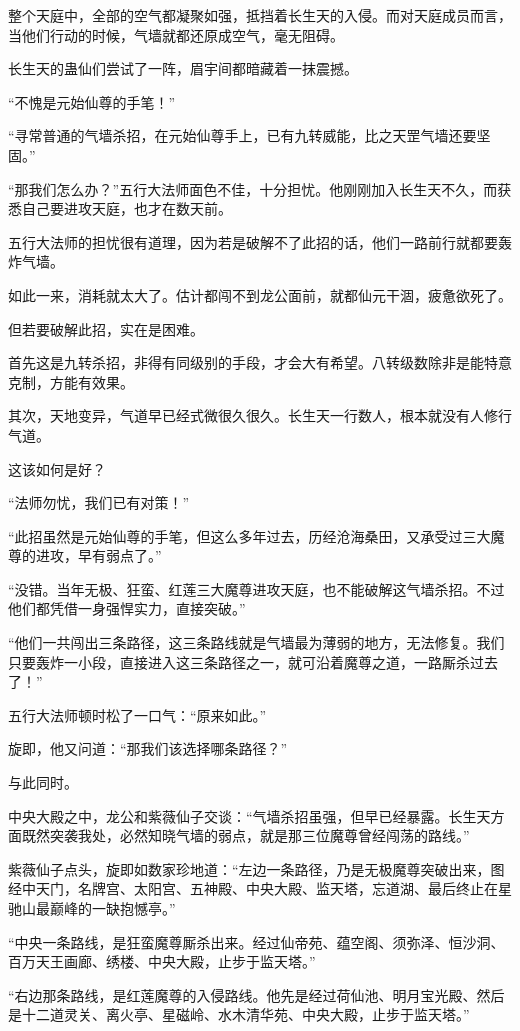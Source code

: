 \begin{this_body}
整个天庭中，全部的空气都凝聚如强，抵挡着长生天的入侵。而对天庭成员而言，当他们行动的时候，气墙就都还原成空气，毫无阻碍。

长生天的蛊仙们尝试了一阵，眉宇间都暗藏着一抹震撼。

“不愧是元始仙尊的手笔！”

“寻常普通的气墙杀招，在元始仙尊手上，已有九转威能，比之天罡气墙还要坚固。”

“那我们怎么办？”五行大法师面色不佳，十分担忧。他刚刚加入长生天不久，而获悉自己要进攻天庭，也才在数天前。

五行大法师的担忧很有道理，因为若是破解不了此招的话，他们一路前行就都要轰炸气墙。

如此一来，消耗就太大了。估计都闯不到龙公面前，就都仙元干涸，疲惫欲死了。

但若要破解此招，实在是困难。

首先这是九转杀招，非得有同级别的手段，才会大有希望。八转级数除非是能特意克制，方能有效果。

其次，天地变异，气道早已经式微很久很久。长生天一行数人，根本就没有人修行气道。

这该如何是好？

“法师勿忧，我们已有对策！”

“此招虽然是元始仙尊的手笔，但这么多年过去，历经沧海桑田，又承受过三大魔尊的进攻，早有弱点了。”

“没错。当年无极、狂蛮、红莲三大魔尊进攻天庭，也不能破解这气墙杀招。不过他们都凭借一身强悍实力，直接突破。”

“他们一共闯出三条路径，这三条路线就是气墙最为薄弱的地方，无法修复。我们只要轰炸一小段，直接进入这三条路径之一，就可沿着魔尊之道，一路厮杀过去了！”

五行大法师顿时松了一口气：“原来如此。”

旋即，他又问道：“那我们该选择哪条路径？”

与此同时。

中央大殿之中，龙公和紫薇仙子交谈：“气墙杀招虽强，但早已经暴露。长生天方面既然突袭我处，必然知晓气墙的弱点，就是那三位魔尊曾经闯荡的路线。”

紫薇仙子点头，旋即如数家珍地道：“左边一条路径，乃是无极魔尊突破出来，图经中天门，名牌宫、太阳宫、五神殿、中央大殿、监天塔，忘道湖、最后终止在星驰山最巅峰的一缺抱憾亭。”

“中央一条路线，是狂蛮魔尊厮杀出来。经过仙帝苑、蕴空阁、须弥泽、恒沙洞、百万天王画廊、绣楼、中央大殿，止步于监天塔。”

“右边那条路线，是红莲魔尊的入侵路线。他先是经过荷仙池、明月宝光殿、然后是十二道灵关、离火亭、星磁岭、水木清华苑、中央大殿，止步于监天塔。”


\end{this_body}
